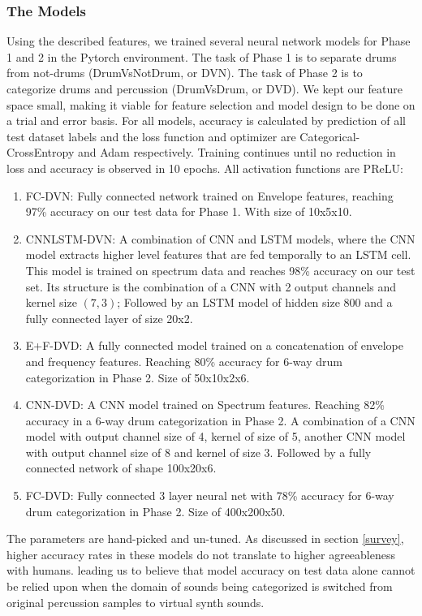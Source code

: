 \documentclass{nime-alternate} %
\begin{document}
\subsubsection{The Models}
Using the described features, we trained several neural network models for Phase 1 and 2 in the Pytorch environment. The task of Phase 1 is to separate drums from not-drums (DrumVsNotDrum, or DVN). The task of Phase 2 is to categorize drums and percussion (DrumVsDrum, or DVD). We kept our feature space small, making it viable for feature selection and model design to be done on a trial and error basis. For all models, accuracy is calculated by prediction of all test dataset labels and the loss function and optimizer are Categorical-CrossEntropy and Adam respectively. Training continues until no reduction in loss and accuracy is observed in 10 epochs.  All activation functions are PReLU:
\begin {enumerate}
\item FC-DVN: Fully connected network trained on Envelope features, reaching 97\% accuracy on our test data for Phase 1. With size of 10x5x10.
\item CNNLSTM-DVN: A combination of CNN and LSTM models, where the CNN model extracts higher level features that are fed temporally to an LSTM cell. This model is trained on spectrum data and reaches 98\% accuracy on our test set. Its structure is the combination of a CNN with 2 output channels and kernel size $(7,3)$; Followed by an LSTM model of hidden size 800 and a fully connected layer of size 20x2.
\item E+F-DVD: A fully connected model trained on a concatenation of envelope and frequency features. Reaching 80\% accuracy for 6-way drum categorization in Phase 2. Size of 50x10x2x6.
\item CNN-DVD: A CNN model trained on Spectrum features. Reaching 82\% accuracy in a 6-way drum categorization in Phase 2. A combination of a CNN model with output channel size of 4, kernel of size of 5, another CNN model with output channel size of 8 and kernel of size 3. Followed by a fully connected network of shape 100x20x6.
\item FC-DVD: Fully connected 3 layer neural net with 78\% accuracy for 6-way drum categorization in Phase 2. Size of 400x200x50.
\end{enumerate}
The parameters are hand-picked and un-tuned. As discussed in section \ref{survey}, higher accuracy rates in these models do not translate to higher agreeableness with humans. leading us to believe that model accuracy on test data alone cannot be relied upon when the domain of sounds 
being categorized is switched from original percussion samples to virtual synth sounds.
\end{document}
